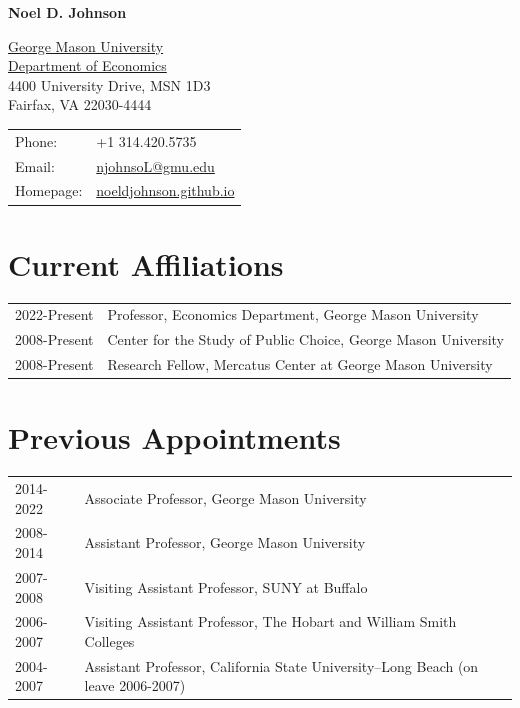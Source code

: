 \documentclass[11pt,fullpage]{article}
\def\name{Noel D. Johnson}
\begin{document}


\centerline{\Large \bf \name}

\vspace{0.25in}

\begin{minipage}{0.50\linewidth}
  \href{http://www.gmu.edu/}{George Mason University} \\
  \href{http://www.gmu.edu/centers/publicchoice/}{Department of Economics} \\
   4400 University Drive, MSN 1D3 \\
  Fairfax, VA 22030-4444
\end{minipage}
\begin{minipage}{0.50\linewidth}
  \begin{tabular}{ll}
    Phone: & +1 314.420.5735 \\
    Email: & \href{mailto:njohnsoL@gmu.edu}{njohnsoL@gmu.edu} \\
    Homepage: & \href{https://noeldjohnson.github.io}{noeldjohnson.github.io} \\
  \end{tabular}
\end{minipage}

\vspace{.25cm}


\section*{Current Affiliations}

\begin{tabular}{ll}
	2022-Present & Professor, Economics Department, George Mason University \\
	2008-Present & Center for the Study of Public Choice, George Mason University \\
	2008-Present & Research Fellow, Mercatus Center at George Mason University \\
\end{tabular}

\section*{Previous Appointments}

\begin{tabular}{ll}
	2014-2022 & Associate Professor, George Mason University \\
	2008-2014 & Assistant Professor, George Mason University \\
	2007-2008 & Visiting Assistant Professor, SUNY at Buffalo \\
	2006-2007 & Visiting Assistant Professor, The Hobart and William Smith Colleges \\
	2004-2007 & Assistant Professor, California State University--Long Beach (on leave 2006-2007) \\
\end{tabular}
\end{document}
